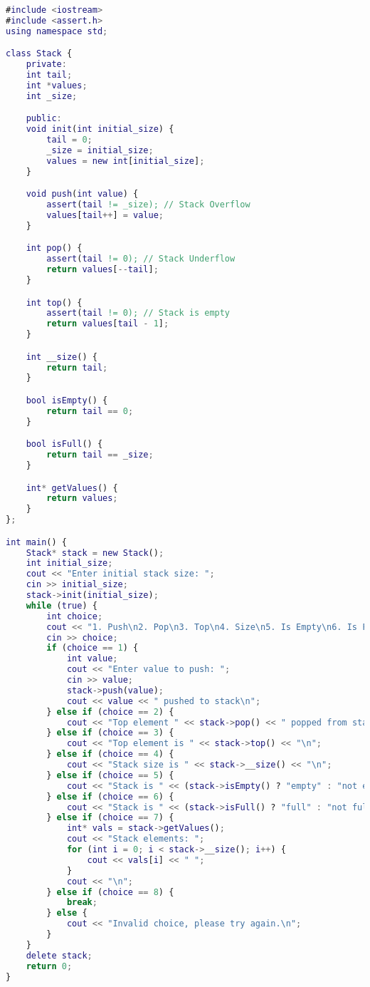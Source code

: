 \documentclass{article}
\begin{document}
\lstset{style=myStyle}
\begin{lstlisting}[caption=소스코드, language=Matlab]
#include <iostream>
#include <assert.h>
using namespace std;

class Stack {
    private:
    int tail;
    int *values;
    int _size;

    public:
    void init(int initial_size) {
        tail = 0;
        _size = initial_size;
        values = new int[initial_size];
    }

    void push(int value) {
        assert(tail != _size); // Stack Overflow
        values[tail++] = value;
    }

    int pop() {
        assert(tail != 0); // Stack Underflow
        return values[--tail];
    }

    int top() {
        assert(tail != 0); // Stack is empty
        return values[tail - 1];
    }

    int __size() {
        return tail;
    }

    bool isEmpty() {
        return tail == 0;
    }

    bool isFull() {
        return tail == _size;
    }

    int* getValues() {
        return values;
    }
};

int main() {
    Stack* stack = new Stack();
    int initial_size;
    cout << "Enter initial stack size: ";
    cin >> initial_size;
    stack->init(initial_size);
    while (true) {
        int choice;
        cout << "1. Push\n2. Pop\n3. Top\n4. Size\n5. Is Empty\n6. Is Full\n7. Print Stack\n8. Exit\nEnter your choice: ";
        cin >> choice;
        if (choice == 1) {
            int value;
            cout << "Enter value to push: ";
            cin >> value;
            stack->push(value);
            cout << value << " pushed to stack\n";
        } else if (choice == 2) {
            cout << "Top element " << stack->pop() << " popped from stack\n";
        } else if (choice == 3) {
            cout << "Top element is " << stack->top() << "\n";
        } else if (choice == 4) {
            cout << "Stack size is " << stack->__size() << "\n";
        } else if (choice == 5) {
            cout << "Stack is " << (stack->isEmpty() ? "empty" : "not empty") << "\n";
        } else if (choice == 6) {
            cout << "Stack is " << (stack->isFull() ? "full" : "not full") << "\n";
        } else if (choice == 7) {
            int* vals = stack->getValues();
            cout << "Stack elements: ";
            for (int i = 0; i < stack->__size(); i++) {
                cout << vals[i] << " ";
            }
            cout << "\n";
        } else if (choice == 8) {
            break;
        } else {
            cout << "Invalid choice, please try again.\n";
        }
    }
    delete stack;
    return 0;
}
\end{lstlisting}
\end{document}
